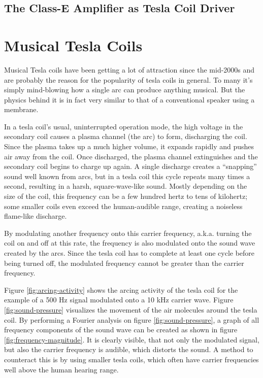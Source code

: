 \subsection{The Class-E Amplifier as Tesla Coil Driver}

\section{Musical Tesla Coils}

Musical Tesla coils have been getting a lot of attraction since the mid-2000s and are probably the reason for the popularity of tesla coils in general. To many it's simply mind-blowing how a single arc can produce anything musical. But the physics behind it is in fact very similar to that of a conventional speaker using a membrane.

In a tesla coil's usual, uninterrupted operation mode, the high voltage in the secondary coil causes a plasma channel (the arc) to form, discharging the coil. Since the plasma takes up a much higher volume, it expands rapidly and pushes air away from the coil. Once discharged, the plasma channel extinguishes and the secondary coil begins to charge up again. A single discharge creates a \enquote{snapping} sound well known from arcs, but in a tesla coil this cycle repeats many times a second, resulting in a harsh, square-wave-like sound. Mostly depending on the size of the coil, this frequency can be a few hundred hertz to tens of kilohertz; some smaller coils even exceed the human-audible range, creating a noiseless flame-like discharge.

By modulating another frequency onto this carrier frequency, a.k.a. turning the coil on and off at this rate, the frequency is also modulated onto the sound wave created by the arcs. Since the tesla coil has to complete at least one cycle before being turned off, the modulated frequency cannot be greater than the carrier frequency. 

Figure \ref{fig:arcing-activity} shows the arcing activity of the tesla coil for the example of a 500 Hz signal modulated onto a 10 kHz carrier wave. Figure \ref{fig:sound-pressure} visualizes the movement of the air molecules around the tesla coil. By performing a Fourier analysis on figure \ref{fig:sound-pressure}, a graph of all frequency components of the sound wave can be created as shown in figure \ref{fig:frequency-magnitude}. It is clearly visible, that not only the modulated signal, but also the carrier frequency is audible, which distorts the sound. A method to counteract this is by using smaller tesla coils, which often have carrier frequencies well above the human hearing range.


